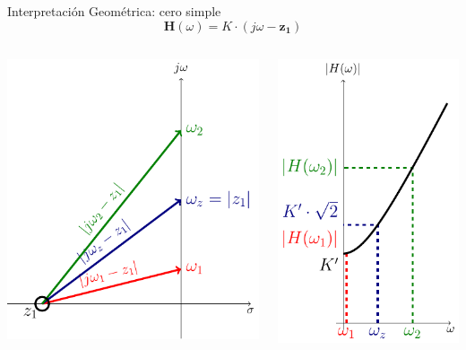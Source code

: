 \documentclass[aspectratio=169, usenames,svgnames,dvipsnames]{beamer}
\newcommand{\fasor}[1]{\mathbf{#1}(\omega)}
\begin{document}
\begin{frame}[label={sec:orgea44109}]{Interpretación Geométrica: cero simple}
\[
  \fasor{H} = K \cdot (j\omega - \mathbf{z_1})
\]

\begin{columns}
\begin{column}{0.5\columnwidth}
\begin{center}
\includegraphics[height=0.7\textheight]{../figs/CeroGeometrica.pdf}
\end{center}
\end{column}

\begin{column}{0.5\columnwidth}
\begin{center}
\includegraphics[height=0.7\textheight]{../figs/CeroGeometricaPlot.pdf}
\end{center}
\end{column}
\end{columns}
\end{frame}
\end{document}
